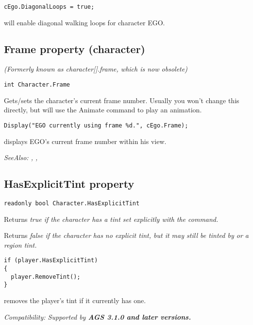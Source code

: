 \begin{verbatim}
cEgo.DiagonalLoops = true;
\end{verbatim}
will enable diagonal walking loops for character EGO.


\subsection{Frame property (character)}\label{Character.Frame}%

\it{(Formerly known as character[].frame, which is now obsolete)}

\begin{verbatim}
int Character.Frame
\end{verbatim}
Gets/sets the character's current frame number. Usually you won't change this
directly, but will use the Animate command to play an animation.

\begin{verbatim}
Display("EGO currently using frame %d.", cEgo.Frame);
\end{verbatim}
displays EGO's current frame number within his view.

\it{SeeAlso:} ,
,


\subsection{HasExplicitTint property}\label{Character.HasExplicitTint}%

\begin{verbatim}
readonly bool Character.HasExplicitTint
\end{verbatim}
Returns \it{true} if the character has a tint set explicitly with the
 command.

Returns \it{false} if the character has no explicit tint, but it may still be
tinted by  or a region tint.

\begin{verbatim}
if (player.HasExplicitTint)
{
  player.RemoveTint();
}
\end{verbatim}
removes the player's tint if it currently has one.

\it{Compatibility:} Supported by \bf{AGS 3.1.0} and later versions.

